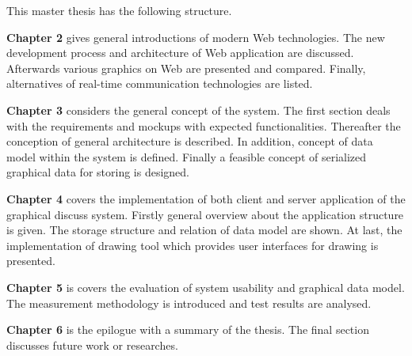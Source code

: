 This master thesis has the following structure.

\textbf{Chapter 2} gives general introductions of modern Web technologies. The new development process and architecture of Web application are discussed. Afterwards various graphics on Web are presented and compared. Finally, alternatives of real-time communication technologies are listed.


\textbf{Chapter 3} considers the general concept of the system. The first section deals with the requirements and mockups with expected functionalities. Thereafter the conception of general architecture is described. In addition, concept of data model within the system is defined. Finally a feasible concept of serialized graphical data for storing is designed.

\textbf{Chapter 4} covers the implementation of both client and server application of the graphical discuss system. Firstly general overview about the application structure is given. The storage structure and relation of data model are shown. At last, the implementation of drawing tool which provides user interfaces for drawing is presented.

\textbf{Chapter 5} is covers the evaluation of system usability and graphical data model. The measurement methodology is introduced and test results are analysed. 

\textbf{Chapter 6} is the epilogue with a summary of the thesis. The final section discusses future work or researches.